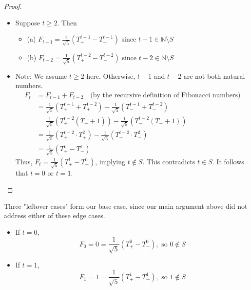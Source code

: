 \documentclass[11pt]{article}
\begin{document}
\begin{enumerate}
\begin{proof}
              \begin{itemize}
                  \item Suppose $t \geq 2$. Then
                        \begin{itemize}
                            \item (a) $F_{t-1} = \frac{1}{\sqrt{5}} \left( T_+^{t-1} - T_-^{t-1} \right)$ since $t-1 \in \mathbb{N} \setminus S$
                            \item (b) $F_{t-2} = \frac{1}{\sqrt{5}} \left( T_+^{t-2} - T_-^{t-2} \right)$ since $t-2 \in \mathbb{N} \setminus S$
                        \end{itemize}
                  \item Note: We assume $t \geq 2$ here. Otherwise, $t-1$ and $t-2$ are not both
                        natural numbers.
                        \[
                            \begin{aligned}
                                F_t & = F_{t-1} + F_{t-2} \quad \text{(by the recursive definition of Fibonacci numbers)}                                 \\
                                    & = \frac{1}{\sqrt{5}} \left( T_+^{t-1} + T_+^{t-2} \right) - \frac{1}{\sqrt{5}} \left( T_-^{t-1} + T_-^{t-2} \right) \\
                                    & = \frac{1}{\sqrt{5}} \left( T_+^{t-2} (T_+ + 1) \right) - \frac{1}{\sqrt{5}} \left( T_-^{t-2} (T_- + 1) \right)     \\
                                    & = \frac{1}{\sqrt{5}} \left( T_+^{t-2} \cdot T_+^2 \right) - \frac{1}{\sqrt{5}} \left( T_-^{t-2} \cdot T_-^2 \right) \\
                                    & = \frac{1}{\sqrt{5}} \left( T_+^t - T_-^t \right)
                            \end{aligned}
                        \]
                        Thus, $F_t = \frac{1}{\sqrt{5}} \left( T_+^t - T_-^t \right)$, implying $t
                            \notin S$. This contradicts $t \in S$. It follows that $t = 0$ or $t = 1$.
              \end{itemize}
          \end{proof}
          \begin{remark} Three "leftover cases" form our base case, since our main argument above did not address either of these edge cases.
          \end{remark}
          \begin{itemize}
              \item If $t = 0$,
                    \[
                        F_0 = 0 = \frac{1}{\sqrt{5}} \left( T_+^0 - T_-^0 \right), \text{ so } 0 \notin S
                    \]
              \item If $t = 1$,
                    \[
                        F_1 = 1 = \frac{1}{\sqrt{5}} \left( T_+^1 - T_-^1 \right), \text{ so } 1 \notin S
                    \]
          \end{itemize}


\end{enumerate}
\end{document}
